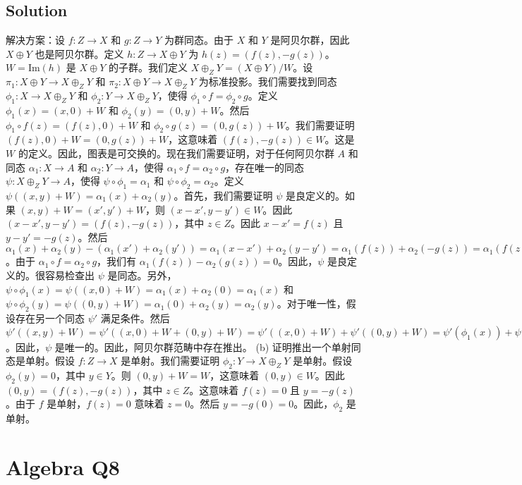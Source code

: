 \documentclass[12pt]{book}
\begin{document}
\subsection*{Solution}
解决方案：设 $f: Z \to X$ 和 $g: Z \to Y$ 为群同态。由于 $X$ 和 $Y$ 是阿贝尔群，因此 $X \oplus Y$ 也是阿贝尔群。定义 $h: Z \to X \oplus Y$ 为 $h(z) = (f(z), -g(z))$。$W = \text{Im}(h)$ 是 $X \oplus Y$ 的子群。我们定义 $X \oplus_Z Y = (X \oplus Y) / W$。设 $\pi_1: X \oplus Y \to X \oplus_Z Y$ 和 $\pi_2: X \oplus Y \to X \oplus_Z Y$ 为标准投影。我们需要找到同态 $\phi_1: X \to X \oplus_Z Y$ 和 $\phi_2: Y \to X \oplus_Z Y$，使得 $\phi_1 \circ f = \phi_2 \circ g$。定义 $\phi_1(x) = (x, 0) + W$ 和 $\phi_2(y) = (0, y) + W$。然后 $\phi_1 \circ f(z) = (f(z), 0) + W$ 和 $\phi_2 \circ g(z) = (0, g(z)) + W$。我们需要证明 $(f(z), 0) + W = (0, g(z)) + W$，这意味着 $(f(z), -g(z)) \in W$。这是 $W$ 的定义。因此，图表是可交换的。现在我们需要证明，对于任何阿贝尔群 $A$ 和同态 $\alpha_1: X \to A$ 和 $\alpha_2: Y \to A$，使得 $\alpha_1 \circ f = \alpha_2 \circ g$，存在唯一的同态 $\psi: X \oplus_Z Y \to A$，使得 $\psi \circ \phi_1 = \alpha_1$ 和 $\psi \circ \phi_2 = \alpha_2$。定义 $\psi((x, y) + W) = \alpha_1(x) + \alpha_2(y)$。首先，我们需要证明 $\psi$ 是良定义的。如果 $(x, y) + W = (x', y') + W$，则 $(x-x', y-y') \in W$。因此 $(x-x', y-y') = (f(z), -g(z))$，其中 $z \in Z$。因此 $x-x' = f(z)$ 且 $y-y' = -g(z)$。然后 $\alpha_1(x) + \alpha_2(y) - (\alpha_1(x') + \alpha_2(y')) = \alpha_1(x-x') + \alpha_2(y-y') = \alpha_1(f(z)) + \alpha_2(-g(z)) = \alpha_1(f(z)) - \alpha_2(g(z))$。由于 $\alpha_1 \circ f = \alpha_2 \circ g$，我们有 $\alpha_1(f(z)) - \alpha_2(g(z)) = 0$。因此，$\psi$ 是良定义的。很容易检查出 $\psi$ 是同态。另外，$\psi \circ \phi_1(x) = \psi((x, 0) + W) = \alpha_1(x) + \alpha_2(0) = \alpha_1(x)$ 和 $\psi \circ \phi_2(y) = \psi((0, y) + W) = \alpha_1(0) + \alpha_2(y) = \alpha_2(y)$。对于唯一性，假设存在另一个同态 $\psi'$ 满足条件。然后 $\psi'((x, y) + W) = \psi'((x, 0) + W + (0, y) + W) = \psi'((x, 0) + W) + \psi'((0, y) + W) = \psi'(\phi_1(x)) + \psi'(\phi_2(y)) = \alpha_1(x) + \alpha_2(y) = \psi((x, y) + W)$。因此，$\psi$ 是唯一的。因此，阿贝尔群范畴中存在推出。 (b) 证明推出一个单射同态是单射。假设 $f: Z \to X$ 是单射。我们需要证明 $\phi_2: Y \to X \oplus_Z Y$ 是单射。假设 $\phi_2(y) = 0$，其中 $y \in Y$。则 $(0, y) + W = W$，这意味着 $(0, y) \in W$。因此 $(0, y) = (f(z), -g(z))$，其中 $z \in Z$。这意味着 $f(z) = 0$ 且 $y = -g(z)$。由于 $f$ 是单射，$f(z) = 0$ 意味着 $z = 0$。然后 $y = -g(0) = 0$。因此，$\phi_2$ 是单射。
\newpage
\section{Algebra Q8}
\end{document}
